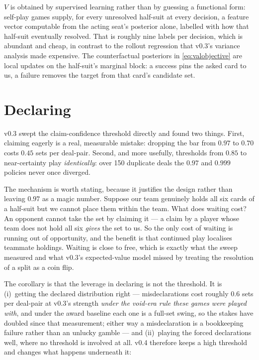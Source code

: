 \documentclass[11pt,a4paper]{article}
\begin{document}
$V$ is obtained by supervised learning rather than by guessing a functional form:
self-play games supply, for every unresolved half-suit at every decision, a
feature vector computable from the acting seat's posterior alone, labelled with
how that half-suit eventually resolved. That is roughly nine labels per
decision, which is abundant and cheap, in contrast to the rollout regression
that v0.3's variance analysis made expensive. The counterfactual posteriors in
\eqref{eq:valobjective} are local updates on the half-suit's marginal block: a
success pins the asked card to us, a failure removes the target from that card's
candidate set.

\section{Declaring}
\label{sec:claiming}

v0.3 swept the claim-confidence threshold directly and found two things. First,
claiming eagerly is a real, measurable mistake: dropping the bar from $0.97$ to
$0.70$ costs $0.45$ sets per deal-pair. Second, and more usefully, thresholds
from $0.85$ to near-certainty play \emph{identically}: over 150 duplicate deals
the $0.97$ and $0.999$ policies never once diverged.

The mechanism is worth stating, because it justifies the design rather than
leaving $0.97$ as a magic number. Suppose our team genuinely holds all six cards
of a half-suit but we cannot place them within the team. What does waiting cost?
An opponent cannot take the set by claiming it --- a claim by a player whose team
does not hold all six \emph{gives} the set to us. So the only cost of waiting is
running out of opportunity, and the benefit is that continued play localises
teammate holdings. Waiting is close to free, which is exactly what the sweep
measured and what v0.3's expected-value model missed by treating the resolution
of a split as a coin flip.

The corollary is that the leverage in declaring is not the threshold. It is
(i)~getting the declared distribution right --- misdeclarations cost roughly
$0.6$ sets per deal-pair at v0.3's strength \emph{under the void-era rule
these games were played with}, and under the award baseline each one is a
full-set swing, so the stakes have doubled since that measurement; either
way a misdeclaration is a bookkeeping failure rather than an unlucky gamble
--- and (ii)~playing the forced declarations well, where no threshold is
involved at all. v0.4 therefore keeps a high threshold and changes what
happens underneath it:
\end{document}
